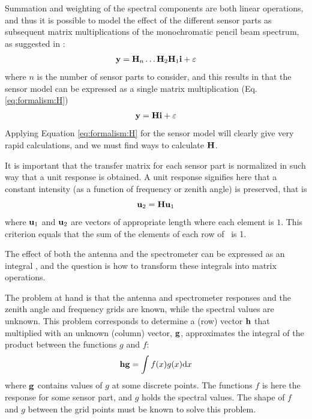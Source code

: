  Summation and weighting of the spectral components are both linear
 operations, and thus it is possible to model the effect of the
 different sensor parts as subsequent matrix multiplications of the
 monochromatic pencil beam spectrum, as suggested in \citet{eriksson:00a}:
 \begin{eqnarray}
   \mathbf{y} = \mathbf{H}_n\dots\mathbf{H}_2\mathbf{H}_1\mathbf{i} + \varepsilon
 \end{eqnarray}
 where $n$ is the number of sensor parts to consider, and this results
 in that the sensor model can be expressed as a single matrix
 multiplication (Eq. \ref{eq:formalism:H})
 \begin{eqnarray}
   \mathbf{y} = \mathbf{H}\mathbf{i} + \varepsilon                     \nonumber
 \end{eqnarray}
 Applying Equation \ref{eq:formalism:H} for the sensor model will
 clearly give very rapid calculations, and we must find ways to
 calculate $\mathbf{H}$.


 \label{sec:sensor:strategy:norm}
 
 It is important that the transfer matrix for
 each sensor part is normalized in such way that a unit response is
 obtained. A unit response signifies here that a constant intensity
 (as a function of frequency or zenith angle) is preserved, that is
 \begin{equation}
   \mathbf{u}_2 = \mathbf{H}\mathbf{u}_1
 \end{equation}
 where $\mathbf{u}_1$ and $\mathbf{u}_2$ are vectors of appropriate length
 where each element is $1$. This criterion equals that the sum of 
 the elements of each row of \Hm\ is 1.


 \label{sec:sensor:integr}
  
 The effect of both the antenna and the spectrometer can be expressed
 as an integral \citep[e.g.][Eq. 86 and 94]{eriksson:97a}, and the
 question is how to transform these integrals into matrix operations.
  
 The problem at hand is that the antenna and spectrometer responses
 and the zenith angle and frequency grids are known, while the spectral
 values are unknown. This problem corresponds to determine a (row)
 vector $\mathbf{h}$ that multiplied with an unknown (column) vector,
 $\mathbf{g}$, approximates the integral of the product between the
 functions $g$ and $f$:
 \begin{equation} 
   \mathbf{hg} = \int{f(x)g(x) \ensuremath{\mathrm{d}}x}
   \label{eq:sensor:integral_problem}
 \end{equation}
 where $\mathbf{g}$ contains values of $g$ at some discrete points. The
 functions $f$ is here the response for some sensor part, and $g$
 holds the spectral values. The shape of $f$ and $g$ between the grid
 points must be known to solve this problem.


